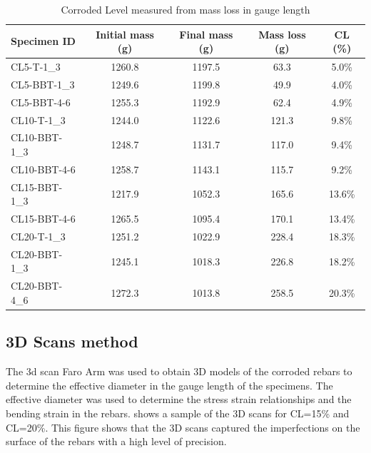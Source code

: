 \begin{table}[]
\caption{Corroded Level measured from mass loss in gauge length}
\label{tab:CL_mass_loss_method}
\begin{center}
\begin{tabular}{lcccc}
Specimen ID & Initial mass (g) & Final mass (g) & Mass loss (g) & CL (\%) \\ \hline
CL5-T-1\_3    & 1260.8           & 1197.5         & 63.3          & 5.0\%   \\
CL5-BBT-1\_3  & 1249.6           & 1199.8         & 49.9          & 4.0\%   \\
CL5-BBT-4-6   & 1255.3           & 1192.9         & 62.4          & 4.9\%   \\
CL10-T-1\_3   & 1244.0           & 1122.6         & 121.3         & 9.8\%   \\
CL10-BBT-1\_3 & 1248.7           & 1131.7         & 117.0         & 9.4\%   \\
CL10-BBT-4-6  & 1258.7           & 1143.1         & 115.7         & 9.2\%   \\
CL15-BBT-1\_3 & 1217.9           & 1052.3         & 165.6         & 13.6\%  \\
CL15-BBT-4-6  & 1265.5           & 1095.4         & 170.1         & 13.4\%  \\
CL20-T-1\_3   & 1251.2           & 1022.9         & 228.4         & 18.3\%  \\
CL20-BBT-1\_3 & 1245.1           & 1018.3         & 226.8         & 18.2\%  \\
CL20-BBT-4\_6  & 1272.3           & 1013.8         & 258.5         & 20.3\% 
\end{tabular}
\end{center}
\end{table}

\subsection{3D Scans method}

The 3d scan Faro Arm was used to obtain 3D models of the corroded rebars to determine the effective diameter in the gauge length of the specimens. The effective diameter was used to determine the stress strain relationships and the bending strain in the rebars.  shows a sample of the 3D scans for CL=15\% and CL=20\%. This figure shows that the 3D scans captured the imperfections on the surface of the rebars with a high level of precision. 

